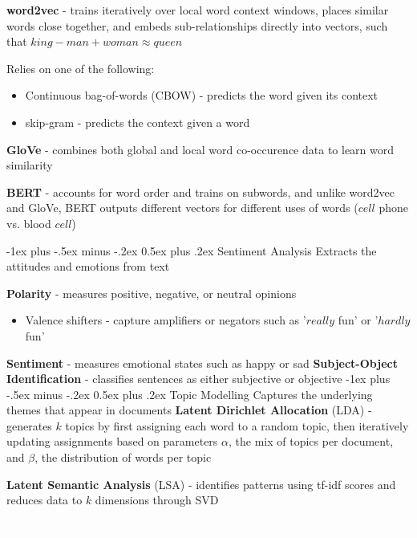 \documentclass[10pt,landscape]{article}
\makeatletter
\renewcommand{\subsection}{\@startsection{subsection}{2}{0mm}%
                                {-1ex plus -.5ex minus -.2ex}%
                                {0.5ex plus .2ex}%
                                {\normalfont\normalsize\bfseries}}
\makeatother
\begin{document}
\begin{multicols}{3}
\textbf{word2vec} - trains iteratively over local  word context windows, places similar words close together, and embeds sub-relationships directly into vectors, such that $king - man + woman \approx queen$

Relies on one of the following:
\begin{itemize}[label={--},leftmargin=4mm]
\itemsep -.4mm
\item Continuous bag-of-words (CBOW) - predicts the word given its context
\item skip-gram - predicts the context given a word
\end{itemize}

\textbf{GloVe} - combines both global and local word co-occurence data to learn word similarity

\textbf{BERT} - accounts for word order and trains on subwords, and unlike word2vec and GloVe, BERT outputs different vectors for different uses of words ($cell$ phone vs. blood $cell$)

\subsection{Sentiment Analysis}
Extracts the attitudes and emotions from text

\textbf{Polarity} - measures positive, negative, or neutral opinions
\begin{itemize}[label={--},leftmargin=4mm]
\itemsep -.4mm
\item Valence shifters - capture amplifiers or negators such as '$really$ fun' or '$hardly$ fun'
\end{itemize}
\textbf{Sentiment} - measures emotional states such as happy or sad
\textbf{Subject-Object Identification} - classifies sentences as either subjective or objective
\subsection{Topic Modelling}
Captures the underlying themes that appear in documents
\textbf{Latent Dirichlet Allocation} (LDA) - generates $k$ topics by first assigning each word to a random topic, then iteratively updating assignments based on parameters $\alpha$, the mix of topics per document, and $\beta$, the distribution of words per topic

\textbf{Latent Semantic Analysis} (LSA) - identifies patterns using tf-idf scores and reduces data to $k$ dimensions through SVD
\columnbreak

\textcolor{white}{.}\vspace{-5mm}\\ %

\end{multicols}
\end{document}
